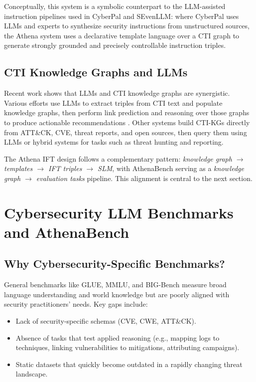 \documentclass[unnumsec,webpdf,contemporary,large]{oup-authoring-template}
\theoremstyle{thmstyleone}
\theoremstyle{thmstyletwo}
\theoremstyle{thmstylethree}
\begin{document}
Conceptually, this system is a symbolic counterpart to the LLM-assisted instruction pipelines used in CyberPal and SEvenLLM: where CyberPal uses LLMs and experts to synthesize security instructions from unstructured sources, the Athena system uses a declarative template language over a CTI graph to generate strongly grounded and precisely controllable instruction triples.

\subsection{CTI Knowledge Graphs and LLMs}

Recent work shows that LLMs and CTI knowledge graphs are synergistic. Various efforts use LLMs to extract triples from CTI text and populate knowledge graphs, then perform link prediction and reasoning over those graphs to produce actionable recommendations \cite{fieblinger2024kg,zhang2023cyberkg,wu2022opencykg,yu2024ctikg,zhao2024kctiaa}. Other systems build CTI-KGs directly from ATT\&CK, CVE, threat reports, and open sources, then query them using LLMs or hybrid systems for tasks such as threat hunting and reporting.

The Athena IFT design follows a complementary pattern: \emph{knowledge graph $\rightarrow$ templates $\rightarrow$ IFT triples $\rightarrow$ SLM}, with AthenaBench serving as a \emph{knowledge graph $\rightarrow$ evaluation tasks} pipeline. This alignment is central to the next section.

\section{Cybersecurity LLM Benchmarks and AthenaBench}
\label{sec:benchmarks}

\subsection{Why Cybersecurity-Specific Benchmarks?}

General benchmarks like GLUE, MMLU, and BIG-Bench measure broad language understanding and world knowledge but are poorly aligned with security practitioners' needs. Key gaps include:

\begin{itemize}
  \item Lack of security-specific schemas (CVE, CWE, ATT\&CK).
  \item Absence of tasks that test applied reasoning (e.g., mapping logs to techniques, linking vulnerabilities to mitigations, attributing campaigns).
  \item Static datasets that quickly become outdated in a rapidly changing threat landscape.
\end{itemize}
\end{document}
